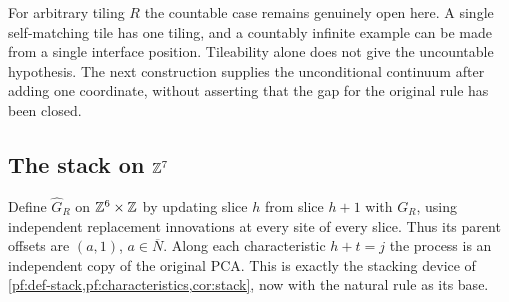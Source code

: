 For arbitrary tiling $R$ the countable case remains genuinely open here. A single self-matching tile has one tiling, and a countably infinite example can be made from a single interface position. Tileability alone does not give the uncountable hypothesis. The next construction supplies the unconditional continuum after adding one coordinate, without asserting that the gap for the original rule has been closed.

\subsection{The stack on \texorpdfstring{$\mathbb{Z}^7$}{Z7}}

Define $\widehat G_R$ on $\mathbb{Z}^6\times\mathbb{Z}$ by updating slice $h$ from slice $h+1$ with $G_R$, using independent replacement innovations at every site of every slice. Thus its parent offsets are $(a,1)$, $a\in\overline N$. Along each characteristic $h+t=j$ the process is an independent copy of the original PCA. This is exactly the stacking device of \cref{pf:def-stack,pf:characteristics,cor:stack}, now with the natural rule as its base.

